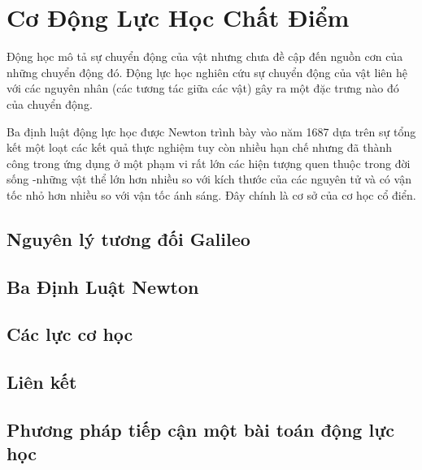   
\chapter{Cơ Động Lực Học Chất Điểm}
Động học mô tả sự chuyển động của vật nhưng chưa đề cập đến nguồn cơn của những chuyển động đó.
Động lực học nghiên cứu sự chuyển động của vật liên hệ với các nguyên nhân (các tương tác giữa các vật) gây ra một đặc trưng nào đó của chuyển động.
\vspace{8pt}

Ba định luật động lực học được Newton trình bày vào năm 1687 dựa trên sự tổng kết một loạt các kết quả thực nghiệm 
tuy còn nhiều hạn chế nhưng đã thành công trong ứng dụng ở một phạm vi rất lớn các hiện tượng quen thuộc trong đời sống
-những vật thể lớn hơn nhiều so với kích thước của các nguyên tử và có vận tốc nhỏ hơn nhiều so với vận tốc ánh sáng.
Đây chính là cơ sở của cơ học cổ điển.




\section{Nguyên lý tương đối Galileo}

\section{Ba Định Luật Newton}

\section{Các lực cơ học}

\section{Liên kết}


\section{Phương pháp tiếp cận một bài toán động lực học}